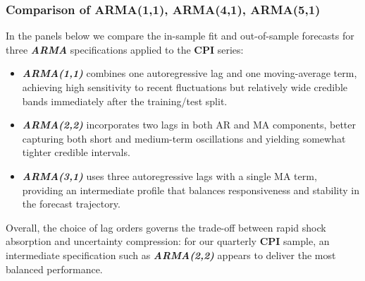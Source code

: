 \documentclass{Configuration_Files/PoliMi3i_thesis}
\begin{document}
\subsubsection*{Comparison of ARMA(1,1), ARMA(4,1), ARMA(5,1)}
In the panels below we compare the in-sample fit and out-of-sample forecasts for three \textbf{\textit{ARMA}} specifications applied to the \textbf{CPI} series:
\begin{itemize}
  \item \textbf{\textit{ARMA(1,1)}} combines one autoregressive lag and one moving-average term, achieving high sensitivity to recent fluctuations but relatively wide credible bands immediately after the training/test split.
  \item \textbf{\textit{ARMA(2,2)}} incorporates two lags in both AR and MA components, better capturing both short and medium-term oscillations and yielding somewhat tighter credible intervals.
  \item \textbf{\textit{ARMA(3,1)}} uses three autoregressive lags with a single MA term, providing an intermediate profile that balances responsiveness and stability in the forecast trajectory.
\end{itemize}

Overall, the choice of lag orders governs the trade-off between rapid shock absorption and uncertainty compression: for our quarterly \textbf{CPI} sample, an intermediate specification such as \textbf{\textit{ARMA(2,2)}} appears to deliver the most balanced performance.
\newpage
\end{document}
